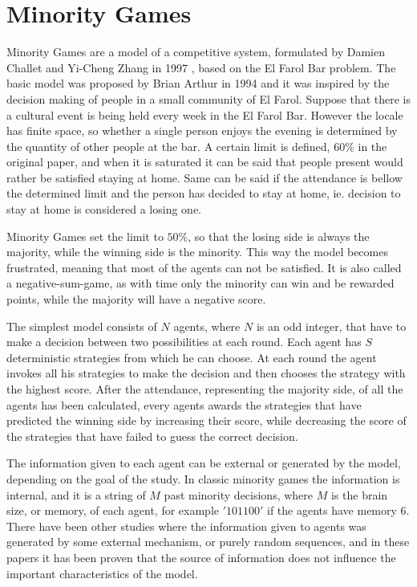 \section{Minority Games}
\label{1:minority}
Minority Games are a model of a competitive system, formulated by Damien Challet and Yi-Cheng Zhang
in 1997 \cite{challet1997emergence}, based on the El Farol Bar problem. 
The basic model was proposed by Brian Arthur in 1994 \cite{arthur1994inductive} and it was inspired by the decision making of people in a small community of El Farol. 
Suppose that there is a cultural event is being held every week in the El Farol Bar. 
However the locale has finite space, so whether a single person enjoys the evening is determined by the quantity of other people at the bar. 
A certain limit is defined, $60\%$ in the original paper, and when it is saturated it can be said that people present would rather be satisfied staying at home. 
Same can be said if the attendance is bellow the determined limit and the person has decided to stay at home, ie. decision to stay at home is considered a losing one.

Minority Games set the limit to $50\%$, so that the losing side is always the majority, while the winning side is the minority.
This way the model becomes frustrated, meaning that most of the agents can not be satisfied.
It is also called a negative-sum-game, as with time only the minority can win and be rewarded points, while the majority will have a negative score.

The simplest model consists of $N$ agents, where $N$ is an odd integer, that have to make a decision between two possibilities at each round.
Each agent has $S$ deterministic strategies from which he can choose.
At each round the agent invokes all his strategies to make the decision and then chooses the strategy with the highest score.
After the attendance, representing the majority side, of all the agents has been calculated, every agents awards the strategies that have predicted the winning side by increasing their score, while decreasing the score of the strategies that have failed to guess the correct decision.

The information given to each agent can be external or generated by the model, depending on the goal of the study.
In classic minority games the information is internal, and it is a string of $M$ past minority decisions, where $M$ is the brain size, or memory, of each agent, for example $'101100'$ if the agents have memory $6$.
There have been other studies where the information given to agents was generated by some external mechanism, or purely random sequences, and in these papers it has been proven that the source of information does not influence the important characteristics of the model.

